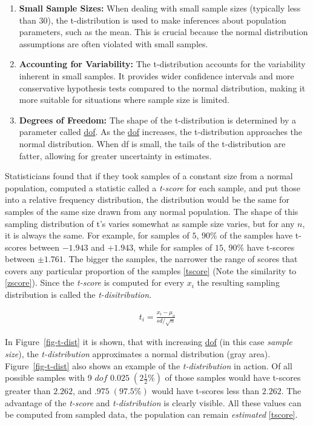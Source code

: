 \documentclass[
  a4paper,
]{scrbook}
\begin{document}
\begin{enumerate}
\def\labelenumi{\arabic{enumi}.}
\item
  \textbf{Small Sample Sizes:} When dealing with small sample sizes
  (typically less than 30), the t-distribution is used to make
  inferences about population parameters, such as the mean. This is
  crucial because the normal distribution assumptions are often violated
  with small samples.
\item
  \textbf{Accounting for Variability:} The t-distribution accounts for
  the variability inherent in small samples. It provides wider
  confidence intervals and more conservative hypothesis tests compared
  to the normal distribution, making it more suitable for situations
  where sample size is limited.
\item
  \textbf{Degrees of Freedom:} The shape of the t-distribution is
  determined by a parameter called \hyperref[acronyms_dof]{dof}. As the
  \hyperref[acronyms_dof]{dof} increases, the t-distribution approaches
  the normal distribution. When df is small, the tails of the
  t-distribution are fatter, allowing for greater uncertainty in
  estimates.
\end{enumerate}

Statisticians found that if they took samples of a constant size from a
normal population, computed a statistic called a \emph{t-score} for each
sample, and put those into a relative frequency distribution, the
distribution would be the same for samples of the same size drawn from
any normal population. The shape of this sampling distribution of t's
varies somewhat as sample size varies, but for any \(n\), it is always
the same. For example, for samples of \(5\), \(90\%\) of the samples
have t-scores between \(-1.943\) and \(+1.943\), while for samples of
\(15\), \(90\%\) have t-scores between \(\pm 1.761\). The bigger the
samples, the narrower the range of scores that covers any particular
proportion of the samples \eqref{tscore} (Note the similarity to
\eqref{zscore}). Since the \emph{t-score} is computed for every \(x_i\)
the resulting sampling distribution is called the
\emph{t-disitribution}.

\begin{align}
t_i = \frac{x_i - \mu_o}{sd/\sqrt{n}} \label{tscore}
\end{align}

In Figure~\ref{fig-t-dist} it is shown, that with increasing
\hyperref[acronyms_dof]{dof} (in this case \emph{sample size}), the
\emph{t-distribution} approximates a normal distribution (gray area).
Figure~\ref{fig-t-dist} also shows an example of the
\emph{t-distribution} in action. Of all possible samples with 9
\hyperref[dof]{\(dof\)} \(0.025\;(2\frac{1}{2}\%)\) of those samples
would have t-scores greater than \(2.262\), and \(.975\;(97.5\%)\) would
have t-scores less than \(2.262\). The advantage of the \emph{t-score}
and \emph{t-distribution} is clearly visible. All these values can be
computed from sampled data, the population can remain \emph{estimated}
\eqref{tscore}.
\end{document}
